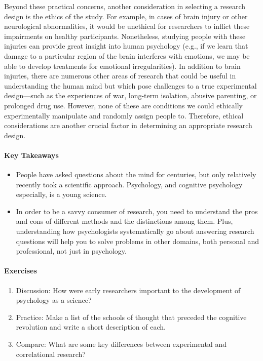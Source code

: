 \documentclass[
]{krantz}
\providecommand{\tightlist}{%
  \setlength{\itemsep}{0pt}\setlength{\parskip}{0pt}}
\begin{document}
Beyond these practical concerns, another consideration in selecting a research design is the ethics of the study. For example, in cases of brain injury or other neurological abnormalities, it would be unethical for researchers to inflict these impairments on healthy participants. Nonetheless, studying people with these injuries can provide great insight into human psychology (e.g., if we learn that damage to a particular region of the brain interferes with emotions, we may be able to develop treatments for emotional irregularities). In addition to brain injuries, there are numerous other areas of research that could be useful in understanding the human mind but which pose challenges to a true experimental design---such as the experiences of war, long-term isolation, abusive parenting, or prolonged drug use. However, none of these are conditions we could ethically experimentally manipulate and randomly assign people to. Therefore, ethical considerations are another crucial factor in determining an appropriate research design.

\paragraph*{Key Takeaways}\label{key-takeaways}

\begin{itemize}
\tightlist
\item
  People have asked questions about the mind for centuries, but only relatively recently took a scientific approach. Psychology, and cognitive psychology especially, is a young science.
\item
  In order to be a savvy consumer of research, you need to understand the pros and cons of different methods and the distinctions among them. Plus, understanding how psychologists systematically go about answering research questions will help you to solve problems in other domains, both personal and professional, not just in psychology.
\end{itemize}

\paragraph*{Exercises}\label{exercises}

\begin{enumerate}
\def\labelenumi{\arabic{enumi}.}
\tightlist
\item
  Discussion: How were early researchers important to the development of psychology as a science?
\item
  Practice: Make a list of the schools of thought that preceded the cognitive revolution and write a short description of each.
\item
  Compare: What are some key differences between experimental and correlational research?
\end{enumerate}
\end{document}
